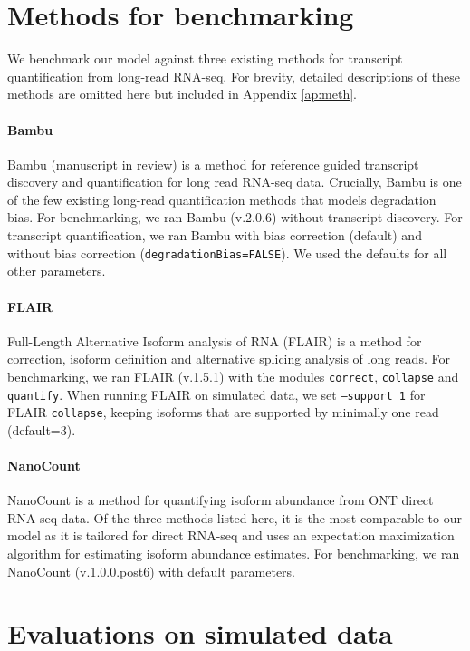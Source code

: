 \section{Methods for benchmarking}

We benchmark our model against three existing methods for transcript quantification from long-read RNA-seq. For brevity, detailed descriptions of these methods are omitted here but included in Appendix \ref{ap:meth}.

\paragraph{Bambu} Bambu (manuscript in review) \cite{Bambu2022} is a method for reference guided transcript discovery and quantification for long read RNA-seq data. Crucially, Bambu is one of the few existing long-read quantification methods that models degradation bias. For benchmarking, we ran Bambu (v.2.0.6) without transcript discovery. For transcript quantification, we ran Bambu with bias correction (default) and without bias correction (\texttt{degradationBias=FALSE}). We used the defaults for all other parameters.

\paragraph{FLAIR} Full-Length Alternative Isoform analysis of RNA (FLAIR) \cite{Tang2020} is a method for correction, isoform definition and alternative splicing analysis of long reads. For benchmarking, we ran FLAIR (v.1.5.1) with the modules \texttt{correct}, \texttt{collapse} and \texttt{quantify}. When running FLAIR on simulated data, we set \texttt{--support 1} for FLAIR \texttt{collapse}, keeping isoforms that are supported by minimally one read (default=3).  

\paragraph{NanoCount} NanoCount \cite{Gleeson2021} is a method for quantifying isoform abundance from ONT direct RNA-seq data. Of the three methods listed here, it is the most comparable to our model as it is tailored for direct RNA-seq and uses an expectation maximization algorithm for estimating isoform abundance estimates. For benchmarking, we ran NanoCount (v.1.0.0.post6) with default parameters.

\section{Evaluations on simulated data}\label{sec:eval-sim}

